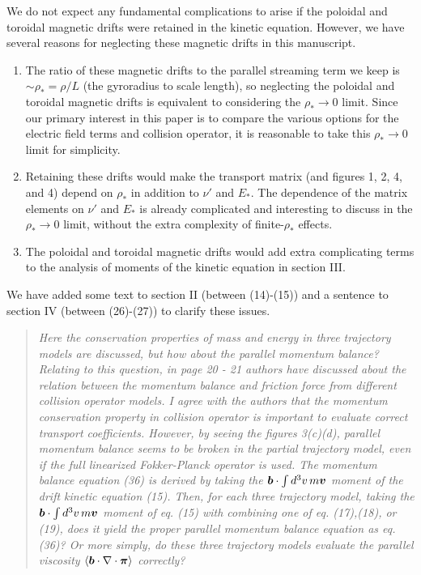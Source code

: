 \documentclass[11pt]{article}
\newcommand{\vect}[1]{\mbox{\boldmath $#1$}}
\newcommand{\todo}[1]{{\color{red}#1}}
\newenvironment{referee}{\begin{quote}\it\color{Blue}}{\end{quote}}
\begin{document}
We do not expect any fundamental complications to arise if the poloidal and toroidal magnetic drifts
were retained in the kinetic equation. 
However, we have several reasons for neglecting these magnetic drifts
 in this manuscript.
\begin{enumerate}
\item The ratio of these magnetic drifts to the parallel streaming term we keep is $\sim \rho_* = \rho / L$
 (the gyroradius to scale length), so neglecting the poloidal and toroidal magnetic drifts is
equivalent to considering the $\rho_* \to 0$ limit.
Since our primary interest in this paper is to compare the various options for the electric field
terms and collision operator, it is reasonable to take this $\rho_* \to 0$ limit for simplicity.
\item
Retaining these drifts would make the transport matrix (and figures 1, 2, 4, and 4)
depend on $\rho_*$ in addition to $\nu'$ and $E_*$. 
The dependence of the matrix elements on $\nu'$ and $E_*$ is already  complicated
and interesting to discuss in the $\rho_* \to 0$ limit,
without the extra complexity of finite-$\rho_*$ effects.
\item The poloidal and toroidal magnetic drifts would add extra complicating
terms to the analysis of moments of the kinetic equation in section III.
\end{enumerate}

We have added some text to section II (between (14)-(15)) and a sentence to section IV (between \todo{(26)-(27)}) to clarify these issues.

\begin{referee}
Here the conservation properties of mass and energy in three trajectory models are discussed,
but how about the parallel momentum balance? Relating to this question, in page 20 - 21
authors have discussed about the relation between the momentum balance and friction force
from different collision operator models. I agree with the authors that the momentum
conservation property in collision operator is important to evaluate correct transport coefficients.
However, by seeing the figures 3(c)(d), parallel momentum balance seems to be broken in the
partial trajectory model, even if the full linearized Fokker-Planck operator is used.
The momentum balance equation (36) is derived by taking the $\vect{b}\cdot \int d^3v\, m\vect{v}$ moment of the drift
kinetic equation (15). Then, for each three trajectory model, taking the $\vect{b}\cdot \int d^3v\, m\vect{v}$ moment of
eq. (15) with combining one of eq. (17),(18), or (19), does it yield the proper parallel momentum
balance equation as eq.(36)? Or more simply, do these three trajectory models evaluate the
parallel viscosity $\left<\vect{b}\cdot\nabla\cdot\vect{\pi}\right>$ correctly?
\end{referee}
\end{document}
